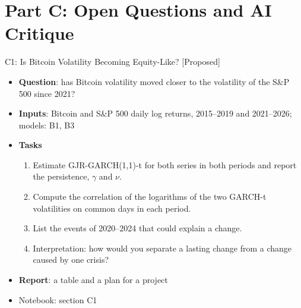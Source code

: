 \section{Part C: Open Questions and AI Critique}

\begin{frame}{C1: Is Bitcoin Volatility Becoming Equity-Like? [Proposed]}
\itemsize{\footnotesize}
\begin{itemize}
\item \textbf{Question}: has Bitcoin volatility moved closer to the volatility of the S\&P 500 since 2021?
\item \textbf{Inputs}: Bitcoin and S\&P 500 daily log returns, 2015--2019 and 2021--2026; models: B1, B3
\item \textbf{Tasks}
\begin{enumerate}
    \item Estimate GJR-GARCH(1,1)-t for both series in both periods and report the persistence, $\gamma$ and $\nu$.
    \item Compute the correlation of the logarithms of the two GARCH-t volatilities on common days in each period.
    \item List the events of 2020--2024 that could explain a change.
    \item Interpretation: how would you separate a lasting change from a change caused by one crisis?
\end{enumerate}
\item \textbf{Report}: a table and a plan for a project
\item Notebook: section C1
\end{itemize}
\end{frame}

